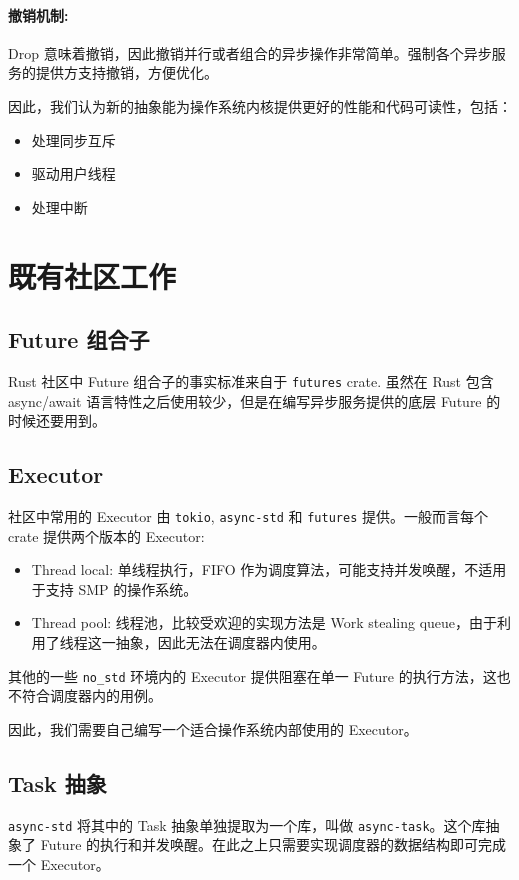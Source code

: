 \documentclass[UTF-8]{ctexart}
\begin{document}
  \paragraph{撤销机制:} Drop 意味着撤销，因此撤销并行或者组合的异步操作非常简单。强制各个异步服务的提供方支持撤销，方便优化。
  
  \vspace{1em}
  因此，我们认为新的抽象能为操作系统内核提供更好的性能和代码可读性，包括：
  \begin{itemize}
    \item 处理同步互斥
    \item 驱动用户线程
    \item 处理中断
  \end{itemize}

  \section{既有社区工作}
  \subsection{Future 组合子}
  Rust 社区中 Future 组合子的事实标准来自于 \texttt{futures} crate. 虽然在 Rust 包含 async/await 语言特性之后使用较少，但是在编写异步服务提供的底层 Future 的时候还要用到。

  \subsection{Executor}
  \label{sec:executor}
  社区中常用的 Executor 由 \texttt{tokio}, \texttt{async-std} 和 \texttt{futures} 提供。一般而言每个 crate 提供两个版本的 Executor:
  \begin{itemize}
    \item Thread local: 单线程执行，FIFO 作为调度算法，可能支持并发唤醒，不适用于支持 SMP 的操作系统。
    \item Thread pool: 线程池，比较受欢迎的实现方法是 Work stealing queue，由于利用了线程这一抽象，因此无法在调度器内使用。
  \end{itemize}

  其他的一些 \texttt{no\_std} 环境内的 Executor 提供阻塞在单一 Future 的执行方法，这也不符合调度器内的用例。

  因此，我们需要自己编写一个适合操作系统内部使用的 Executor。

  \subsection{Task 抽象}
  \texttt{async-std} 将其中的 Task 抽象单独提取为一个库，叫做 \texttt{async-task}。这个库抽象了 Future 的执行和并发唤醒。在此之上只需要实现调度器的数据结构即可完成一个 Executor。
\end{document}
